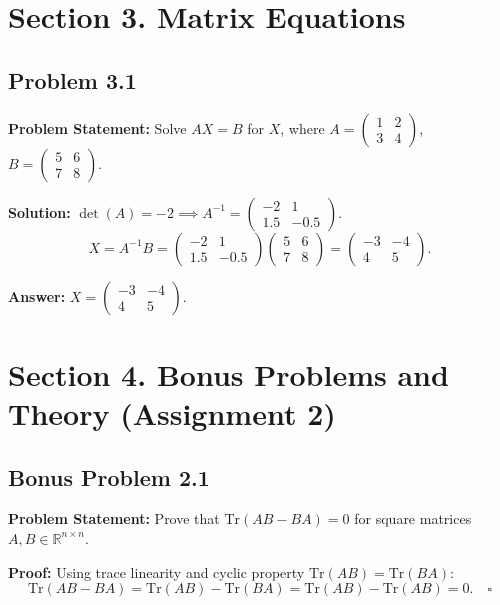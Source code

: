 \documentclass[11pt, a4paper]{article}
\begin{document}
\section{Section 3. Matrix Equations}

\subsection*{Problem 3.1}
\textbf{Problem Statement:} Solve $AX = B$ for $X$, where $A = \begin{pmatrix} 1 & 2 \\ 3 & 4 \end{pmatrix}$, $B = \begin{pmatrix} 5 & 6 \\ 7 & 8 \end{pmatrix}$.

\textbf{Solution:}
$\det(A) = -2 \implies A^{-1} = \begin{pmatrix} -2 & 1 \\ 1.5 & -0.5 \end{pmatrix}$.
$$ X = A^{-1} B = \begin{pmatrix} -2 & 1 \\ 1.5 & -0.5 \end{pmatrix} \begin{pmatrix} 5 & 6 \\ 7 & 8 \end{pmatrix} = \begin{pmatrix} -3 & -4 \\ 4 & 5 \end{pmatrix}. $$

\textbf{Answer:} $X = \begin{pmatrix} -3 & -4 \\ 4 & 5 \end{pmatrix}$.

\newpage

\section{Section 4. Bonus Problems and Theory (Assignment 2)}

\subsection*{Bonus Problem 2.1}
\textbf{Problem Statement:} Prove that $\text{Tr}(AB - BA) = 0$ for square matrices $A, B \in \mathbb{R}^{n \times n}$.

\textbf{Proof:}
Using trace linearity and cyclic property $\text{Tr}(AB) = \text{Tr}(BA)$:
$$ \text{Tr}(AB - BA) = \text{Tr}(AB) - \text{Tr}(BA) = \text{Tr}(AB) - \text{Tr}(AB) = 0. \quad \square $$
\end{document}
